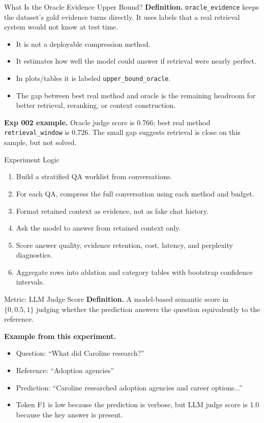 \documentclass[aspectratio=169]{beamer}
\newcommand{\method}[1]{\texttt{#1}}
\newcommand{\metric}[1]{\textbf{#1}}
\begin{document}
\begin{frame}{What Is the Oracle Evidence Upper Bound?}
\metric{Definition.} \method{oracle\_evidence} keeps the dataset's gold evidence turns directly. It uses labels that a real retrieval system would not know at test time.

\vspace{0.5em}
\begin{itemize}
  \item It is not a deployable compression method.
  \item It estimates how well the model could answer if retrieval were nearly perfect.
  \item In plots/tables it is labeled \method{upper\_bound\_oracle}.
  \item The gap between best real method and oracle is the remaining headroom for better retrieval, reranking, or context construction.
\end{itemize}

\vspace{0.5em}
\metric{Exp 002 example.} Oracle judge score is 0.766; best real method \method{retrieval\_window} is 0.726. The small gap suggests retrieval is close on this sample, but not solved.
\end{frame}

\begin{frame}{Experiment Logic}
\begin{enumerate}
  \item Build a stratified QA worklist from conversations.
  \item For each QA, compress the full conversation using each method and budget.
  \item Format retained context as evidence, not as fake chat history.
  \item Ask the model to answer from retained context only.
  \item Score answer quality, evidence retention, cost, latency, and perplexity diagnostics.
  \item Aggregate rows into ablation and category tables with bootstrap confidence intervals.
\end{enumerate}
\end{frame}

\begin{frame}{Metric: LLM Judge Score}
\metric{Definition.} A model-based semantic score in \(\{0, 0.5, 1\}\) judging whether the prediction answers the question equivalently to the reference.

\vspace{0.5em}
\metric{Example from this experiment.}
\begin{itemize}
  \item Question: ``What did Caroline research?''
  \item Reference: ``Adoption agencies''
  \item Prediction: ``Caroline researched adoption agencies and career options...''
  \item Token F1 is low because the prediction is verbose, but LLM judge score is 1.0 because the key answer is present.
\end{itemize}
\end{frame}
\end{document}
